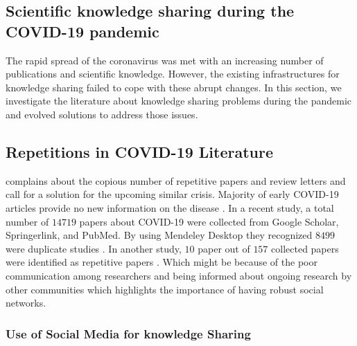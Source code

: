 \documentclass[acmsmall,authordraft]{acmart}
\begin{document}
\subsection{Scientific knowledge sharing during the COVID-19 pandemic}
\label{Scientific knowledge sharing during the COVID-19 pandemic}

The rapid spread of the coronavirus was met with an increasing number of publications and scientific knowledge. However, the existing infrastructures for knowledge sharing failed to cope with these abrupt changes. In this section, we investigate the literature about knowledge sharing problems during the pandemic and evolved solutions to address those issues.


\subsection{Repetitions in COVID-19 Literature}
\label{Repetitions in COVID-19 Literature}

\citet{papes2020redundancy} complains about the copious number of repetitive papers and review letters and call for a solution for the upcoming similar crisis. Majority of early COVID-19 articles provide no new information on the disease \citep{di2020characteristics}. In a recent study, a total number of $14719$ papers about COVID-19 were collected from Google Scholar, Springerlink, and PubMed. By using Mendeley Desktop they recognized $8499$ were duplicate studies \citep{vantarakis2020covid}. In another study, $10$ paper out of $157$ collected papers were identified as repetitive papers \citep{santoso2020cardiac}. Which might be because of the poor communication among researchers and being informed about ongoing research by other communities which highlights the importance of having robust social networks.






\subsubsection{Use of Social Media for knowledge Sharing}
\label{Use of Social Media for knowledge Sharing}
\end{document}
